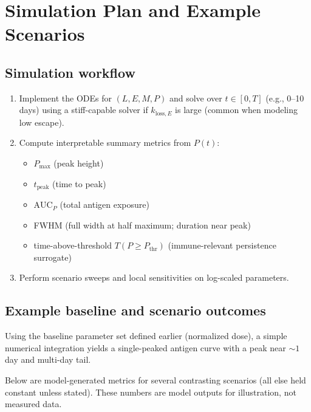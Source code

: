 \section{Simulation Plan and Example Scenarios}

\subsection*{Simulation workflow}

\begin{enumerate}[label=\arabic*.]
    \item Implement the ODEs for $(L,E,M,P)$ and solve over $t\in[0,T]$ (e.g., 0--10 days) using a stiff-capable solver if $k_{\mathrm{loss},E}$ is large (common when modeling low escape).
    \item Compute interpretable summary metrics from $P(t)$:
    \begin{itemize}
        \item $P_{\max}$ (peak height)
        \item $t_{\mathrm{peak}}$ (time to peak)
        \item $\mathrm{AUC}_P$ (total antigen exposure)
        \item FWHM (full width at half maximum; duration near peak)
        \item time-above-threshold $T(P\ge P_{\mathrm{thr}})$ (immune-relevant persistence surrogate)
    \end{itemize}
    \item Perform scenario sweeps and local sensitivities on log-scaled parameters.
\end{enumerate}

\subsection*{Example baseline and scenario outcomes}

Using the baseline parameter set defined earlier (normalized dose), a simple numerical integration yields a single-peaked antigen curve with a peak near $\sim 1$ day and multi-day tail.

Below are model-generated metrics for several contrasting scenarios (all else held constant unless stated). These numbers are model outputs for illustration, not measured data.

